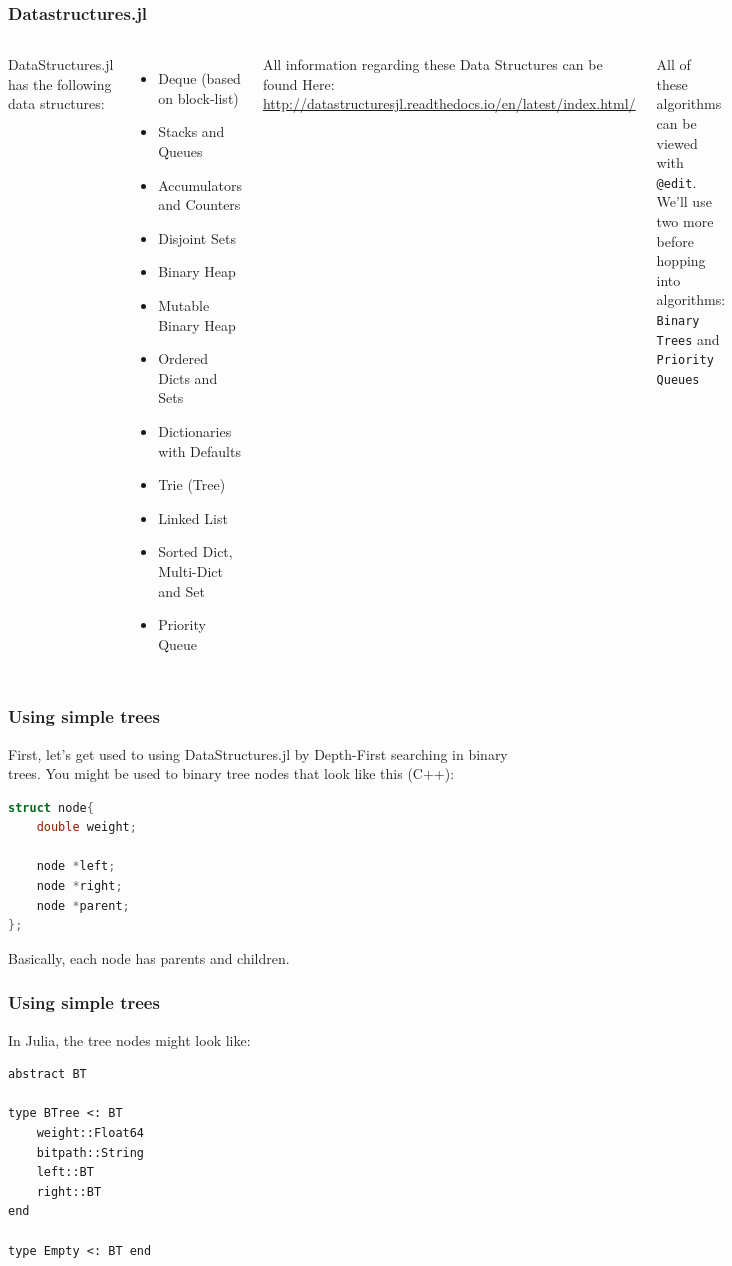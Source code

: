 \documentclass{beamer}
\begin{document}
\begin{frame}
\frametitle{Datastructures.jl}

\begin{columns}
DataStructures.jl has the following data structures:
\begin{itemize}
\item Deque (based on block-list)
\item Stacks and Queues
\item Accumulators and Counters
\item Disjoint Sets
\item Binary Heap
\item Mutable Binary Heap
\item Ordered Dicts and Sets
\item Dictionaries with Defaults
\item Trie (Tree)
\item Linked List
\item Sorted Dict, Multi-Dict and Set
\item Priority Queue
\end{itemize}
\pause
{}
All information regarding these Data Structures can be found Here: \url{ http://datastructuresjl.readthedocs.io/en/latest/index.html/}

\vspace{0.5cm}
All of these algorithms can be viewed with \texttt{@edit}. We'll use two more before hopping into algorithms: \texttt{Binary Trees} and \texttt{Priority Queues}
\end{columns}

\end{frame}


\begin{frame}[fragile]
\frametitle{Using simple trees}
First, let's get used to using DataStructures.jl by Depth-First searching in binary trees. You might be used to binary 	tree nodes that look like this (C++):
\begin{lstlisting}[language=c++]
struct node{
    double weight;

    node *left;
    node *right;
    node *parent;
};
\end{lstlisting}

Basically, each node has parents and children.
\end{frame}

\begin{frame}[fragile]
\frametitle{Using simple trees}
In Julia, the tree nodes might look like:
\begin{lstlisting}
abstract BT 

type BTree <: BT
    weight::Float64
    bitpath::String
    left::BT
    right::BT
end

type Empty <: BT end

\end{lstlisting}
\end{frame}
\end{document}
